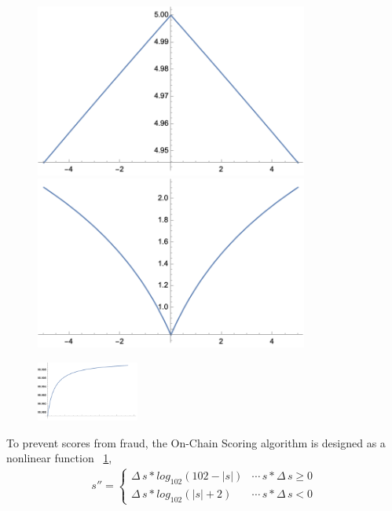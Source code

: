 \documentclass[twoside,twocolumn]{article}
\begin{document}
\begin{figure}
    \centering
    \begin{minipage}{.22\textwidth}
        \centering
        \includegraphics[width=0.8\textwidth]{scoring_p}
    \end{minipage}%
    \begin{minipage}{.22\textwidth}
        \centering
        \includegraphics[width=0.8\textwidth]{scoring_n}
    \end{minipage}
    \label{fig:scoring_d}
\end{figure}

\begin{figure}
    \centering
    \includegraphics[width=0.3\textwidth]{score}
    \label{fig:scoring}
\end{figure}

To prevent scores from fraud, the On-Chain Scoring algorithm is designed as a nonlinear function ~\ref{fig:scoring_d},
\begin{align*}
    {s}''=\left\{\begin{matrix}
                     \Delta\,s*log_{102}(102-|s|) & \cdots\,s*\Delta\,s\geq0 \\
                     \Delta\,s*log_{102}(|s|+2)   & \cdots\,s*\Delta\,s<0
                 \end{matrix}\right.
\end{align*}
\end{document}

